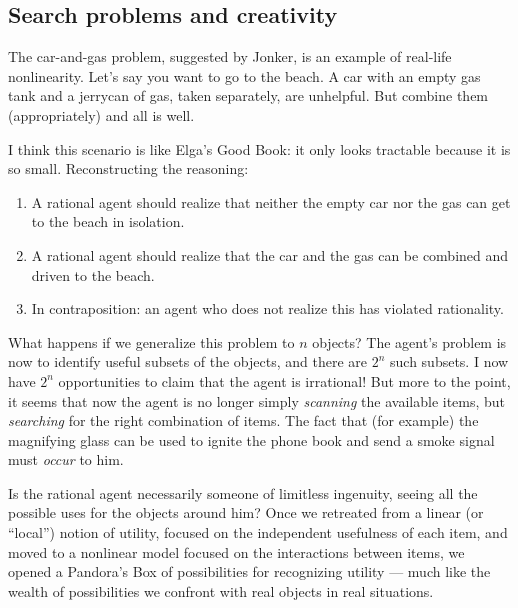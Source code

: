 \documentclass[letterpaper,12pt]{article}
\begin{document}
\subsection{Search problems and creativity}
The car-and-gas problem, suggested by Jonker, is an example of real-life nonlinearity. Let's say you want to go to the beach. A car with an empty gas tank and a jerrycan of gas, taken separately, are unhelpful. But combine them (appropriately) and all is well.

I think this scenario is like Elga's Good Book: it only looks tractable because it is so small. Reconstructing the reasoning:
\begin{enumerate}
\item
A rational agent should realize that neither the empty car nor the gas can get to the beach in isolation.
\item
A rational agent should realize that the car and the gas can be combined and driven to the beach.
\item
In contraposition: an agent who does not realize this has violated rationality.
\end{enumerate}

What happens if we generalize this problem to $n$ objects? The agent's problem is now to identify useful subsets of the objects, and there are $2^n$ such subsets. I now have $2^n$ opportunities to claim that the agent is irrational! But more to the point, it seems that now the agent is no longer simply \emph{scanning} the available items, but \emph{searching} for the right combination of items. The fact that (for example) the magnifying glass can be used to ignite the phone book and send a smoke signal must \emph{occur} to him.

Is the rational agent necessarily someone of limitless ingenuity, seeing all the possible uses for the objects around him? Once we retreated from a linear (or ``local'') notion of utility, focused on the independent usefulness of each item, and moved to a nonlinear model focused on the interactions between items, we opened a Pandora's Box of possibilities for recognizing utility --- much like the wealth of possibilities we confront with real objects in real situations.
\end{document}
